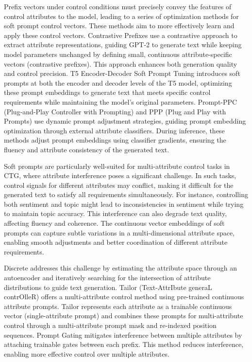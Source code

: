 \documentclass[acmsmall, screen]{acmart}
\begin{document}
Prefix vectors under control conditions must precisely convey the features of control attributes to the model, leading to a series of optimization methods for soft prompt control vectors. These methods aim to more effectively learn and apply these control vectors. Contrastive Prefixes \cite{qian_acl22_ContrastivePrefixes} use a contrastive approach to extract attribute representations, guiding GPT-2 to generate text while keeping model parameters unchanged by defining small, continuous attribute-specific vectors (contrastive prefixes). This approach enhances both generation quality and control precision.
T5 Encoder-Decoder Soft Prompt Tuning \cite{senadeera_arxiv22_T5CTG} introduces soft prompts at both the encoder and decoder levels of the T5 model, optimizing these prompt embeddings to generate text that meets specific control requirements while maintaining the model's original parameters.
Prompt-PPC (Plug-and-Play Controller with Prompting) \cite{wang_GEM23_PPC} and PPP (Plug and Play with Prompts) \cite{ajwani_arxiv24_PPP} use dynamic prompt adjustment strategies, guiding prompt embedding optimization through external attribute classifiers. During inference, these methods adjust prompt embeddings using classifier gradients, ensuring the fluency and attribute consistency of the generated text.

Soft prompts are particularly well-suited for multi-attribute control tasks in CTG, where attribute interference poses a significant challenge. In such tasks, control signals for different attributes may conflict, making it difficult for the generated text to satisfy all requirements simultaneously. For instance, controlling both sentiment and topic might lead to inconsistencies in sentiment while trying to maintain topic accuracy. This interference can also degrade text quality, affecting fluency and coherence. The continuous vector embeddings of soft prompts can capture subtle variations in a multi-dimensional attribute space, enabling smooth adjustments and better coordination of different attribute requirements.

Discrete \cite{gu_emnlp22_Discrete} addresses this challenge by estimating the attribute space through an autoencoder and iteratively searching for the intersection of attribute distributions to guide text generation.
Tailor (Text-AttrIbute generaL contrOlleR) \cite{yang_acl23_Tailor} offers a multi-attribute control method using pre-trained continuous attribute prompts. Tailor represents each attribute as a trainable continuous vector (single-attribute prompt) and combines these prompts for multi-attribute control through a multi-attribute prompt mask and re-indexed position sequences. 
Prompt Gating \cite{huang_acl23_PromptGating} mitigates interference between multiple attributes by attaching trainable gates between each prefix. This method reduces interference, enabling more effective control over multiple attributes.
\end{document}
